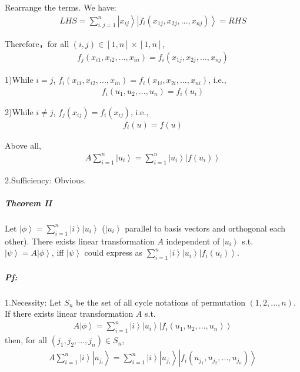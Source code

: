 \documentclass[%
 reprint,
 amsmath,amssymb,
pra,
]{revtex4-1}
\begin{document}
\begin{itemize}
Rearrange the terms. We have: 
\begin{align*}
LHS = \sum_{i, j=1}^n\left|x_{ij}\right\rangle\left|f_{i}\left(x_{1j}, x_{2j}, ..., x_{nj}\right)\right\rangle = RHS
\end{align*}

Therefore，for all $\left(i, j\right) \in \left[1, n\right]\times\left[1, n\right]$, 
\begin{align*}
f_{j}\left(x_{i1}, x_{i2}, ..., x_{in}\right) = f_{i}\left(x_{1j}, x_{2j}, ..., x_{nj}\right)
\end{align*}

1)While $i=j$, $f_{i}\left(x_{i1}, x_{i2}, ..., x_{in}\right) = f_{i}\left(x_{1i}, x_{2i}, ..., x_{ni}\right)$, i.e., 
\begin{align*}
f_i\left(u_1, u_2, ...,u_n\right) = f_i\left(u_i\right)
\end{align*}

2)While $i\neq j$, $f_j\left(x_{ij}\right) = f_i\left(x_{ij}\right)$, i.e., 
\begin{align*}
f_i\left(u\right) = f\left(u\right)
\end{align*}

Above all, 
\begin{align*}
A\sum_{i=1}^{n}\left|u_i\right\rangle = \sum_{i=1}^{n}\left|u_i\right\rangle\left|f\left(u_i\right)\right\rangle
\end{align*}

2.Sufficiency: Obvious.

\subparagraph{Theorem II} Let $\left|\phi\right\rangle = \sum_{i=1}^n \left|i\right\rangle\left|u_i\right\rangle$ ($\left|u_i\right\rangle$ parallel to basis vectors and orthogonal each other). There exists 
linear transformation $A$ independent of $\left|u_{i}\right\rangle$ s.t. $\left|\psi\right\rangle = A\left|\phi\right\rangle$, iff $\left|\psi\right\rangle$ could express as $\sum_{i=1}^n \left|i\right\rangle\left|u_i\right\rangle\left|f_{i}\left(u_i\right)\right\rangle$.

\subparagraph{Pf:} 1.Necessity: Let $S_n$ be the set of all cycle notations of permutation $\left(1, 2, ..., n\right)$. If there exists linear transformation $A$ s.t. 
\begin{align*}
	A\left|\phi\right\rangle = \sum_{i=1}^n \left|i\right\rangle\left|u_i\right\rangle\left|f_{i}\left(u_1, u_2, ..., u_n\right)\right\rangle
\end{align*}
then, for all $\left(j_1, j_2, ..., j_n\right)\in S_n$, 
\begin{align*}
	A\sum_{i=1}^n \left|i\right\rangle\left|u_{j_i}\right\rangle = \sum_{i=1}^n \left|i\right\rangle\left|u_{j_i}\right\rangle\left|f_{i}\left(u_{j_1}, u_{j_2}, ..., u_{j_n}\right)\right\rangle
\end{align*}


\end{itemize}
\end{document}
